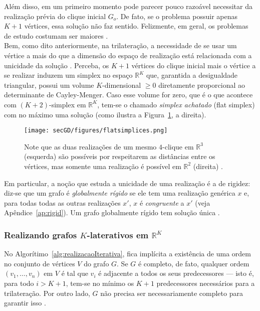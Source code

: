Além disso, em um primeiro momento pode parecer pouco razoável necessitar da realização prévia do clique inicial $G_o$. De fato, se o problema possuir apenas $K+1$ vértices, essa solução não faz sentido. Felizmente, em geral, os problemas de estudo costumam ser maiores \cite{carlileGDandAplications}. 
\\

Bem, como dito anteriormente, na trilateração, a necessidade de se usar um vértice a mais do que a dimensão do espaço de realização está relacionada com a unicidade da solução \cite{hendrickson1992conditions, connelly1991generic}. Perceba, os $K+1$ vértices do clique inicial mais o vértice a se realizar induzem um simplex no espaço $\mathbb{R}^K$ que, garantida a desigualdade triangular, possui um volume $K$-dimensional $\geq 0$ diretamente proporcional ao determinante de Cayley-Menger. Caso esse volume for zero, que é o que acontece com $(K+2)$-simplex em $\mathbb{R}^K$, tem-se o chamado \textit{simplex achatado} (flat simplex) com no máximo uma solução \cite{libertiEDG} (como ilustra a Figura~\ref{fig:flatsimplices}, a direita).

\begin{figure}[H]
	\begin{center}
		\texttt{[image: secGD/figures/flatsimplices.png]}
	\end{center}
	\caption{Note que as duas realizações de um mesmo $4$-clique em $\mathbb{R}^3$ (esquerda) são possíveis por respeitarem as distâncias entre os vértices, mas somente uma realização é possível em $\mathbb{R}^{2}$ (direita) \cite{libertiEDG}.}
	\label{fig:flatsimplices}
\end{figure}

Em particular, a noção que estuda a unicidade de uma realização é a de rigidez: diz-se que um grafo é \textit{globalmente rígido} se ele tem uma realização genérica $x$ e, para todas todas as outras realizações $x'$, $x$ é \textit{congruente} a $x'$ (veja Apêndice~\ref{ap:rigid}). Um grafo globalmente rígido tem solução única \cite{carlileGDandAplications, rigidezGrafosEAplicacoesAnaCarlile}.

\subsubsection{Realizando grafos $K$-laterativos em $\mathbb{R}^K$ \label{sec:oi}}

No Algorítimo~\ref{alg:realizacaoIterativa}, fica implícita a existência de uma ordem no conjunto de vértices $V$ do grafo $G$. Se $G$ é completo, de fato, qualquer ordem $(v_1,\dots,v_n)$ em $V$ é tal que $v_i$ é adjacente a todos os seus predecessores --- isto é, para todo $i>K+1$, tem-se no mínimo os $K+1$ predecessores necessários para a trilateração. Por outro lado, $G$ não precisa ser necessariamente completo para garantir isso \cite{libertiEDG}.

